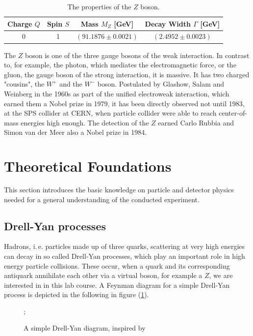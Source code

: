 \documentclass[twocolumn,
			   showpacs,%
               nofootinbib,
               aps,%
               prd,
               notitlepage,
               showkeys,
               10pt]{revtex4-1}
\begin{document}
\begin{table}[!htbp]
	\centering
	\renewcommand{\arraystretch}{1.5}
	\begin{tabular}{c|c|c|c}
	Charge $Q$ & Spin $S$ & Mass $M_Z$ [GeV] & Decay Width $\Gamma$ [GeV] \\ \hline 
	 0 & 1 & $(91.1876 \pm 0.0021)$ & $(2.4952 \pm 0.0023)$ \\
		\end{tabular}
	\caption{\label{tab:Z_props}The properties of the $Z$ boson.}
\end{table}

The $Z$ boson is one of the three gauge bosons of the weak interaction. In contrast to, for example, the photon, which mediates the electromagnetic force, or the gluon, the gauge boson of the strong interaction, it is massive. It has two charged "cousins", the $W^+$ and the $W^-$ boson. Postulated by Glashow, Salam and Weinberg in the 1960s as part of the unified electroweak interaction, which earned them a Nobel prize in 1979, it has been directly observed not until 1983, at the SPS collider at CERN, when particle collider were able to reach center-of-mass energies high enough. The detection of the $Z$ earned Carlo Rubbia and Simon van der Meer also a Nobel prize in 1984.   


\section{Theoretical Foundations}
This section introduces the basic knowledge on particle and detector physics needed for a general understanding of the conducted experiment.

\subsection{Drell-Yan processes}
Hadrons, i.\,e. particles made up of three quarks, scattering at very high energies can decay in so called Drell-Yan processes, which play an important role in high energy particle collisions. These occur, when a quark and its corresponding antiquark annihilate each other via a virtual boson, for example a $Z$, we are interested in in this lab course. A Feynman diagram for a simple Drell-Yan process is depicted in the following in figure (\ref{fig:Drell-Yan}).

\begin{figure}[H]
\centering
{};
\caption{A simple Drell-Yan diagram, inspired by \cite{F91manual}}
\label{fig:Drell-Yan}
\end{figure}
	
\end{document}
